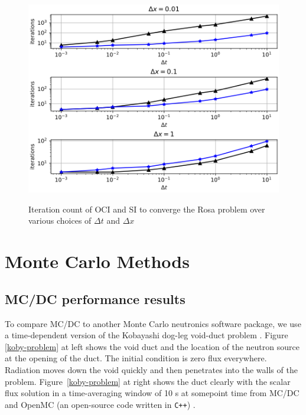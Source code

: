 \begin{figure}[h!]
    \centering
    \caption{Iteration count of OCI and SI to converge the Rosa problem over various choices of $\Delta t$ and $\Delta x$}
    \includegraphics[width=.5\textwidth]{figures/results/time_desc.png}
    \label{fig:time_desc}
\end{figure}

\section{Monte Carlo Methods}

\subsection{MC/DC performance results}

To compare MC/DC to another Monte Carlo neutronics software package, we use a time-dependent version of the Kobayashi dog-leg void-duct problem \cite{Kobayashi2001, variansyah_mc23_mcdc}.
Figure \ref{koby-problem} at left shows the void duct and the location of the neutron source at the opening of the duct.
The initial condition is zero flux everywhere.
Radiation moves down the void quickly and then penetrates into the walls of the problem.
Figure~\ref{koby-problem} at right shows the duct clearly with the scalar flux solution in a time-averaging window of 10 s at somepoint time from MC/DC and OpenMC \cite{romano_openmc_nodate} (an open-source code written in \texttt{C++}) .

